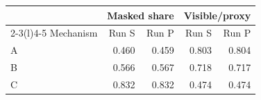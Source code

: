 \begin{tabular}{@{}lrrrr@{}}
\toprule
 & \multicolumn{2}{c}{Masked share} & \multicolumn{2}{c}{Visible/proxy} \\
\cmidrule(lr){2-3}\cmidrule(l){4-5}
Mechanism & Run S & Run P & Run S & Run P \\
\midrule
A & 0.460 & 0.459 & 0.803 & 0.804 \\
B & 0.566 & 0.567 & 0.718 & 0.717 \\
C & 0.832 & 0.832 & 0.474 & 0.474 \\
\bottomrule
\end{tabular}
